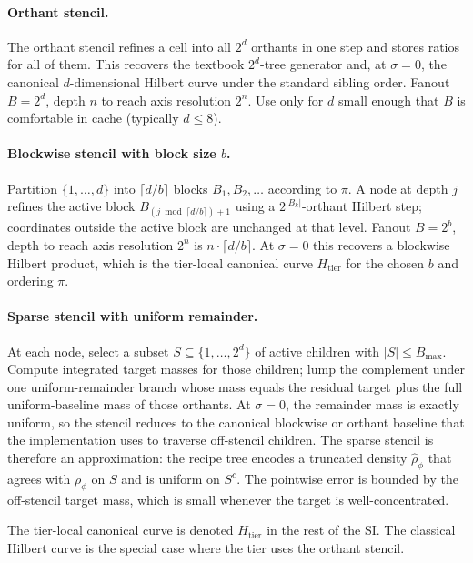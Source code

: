 \documentclass[11pt]{article}
\newcommand{\rhophi}{\rho_{\phi}}
\begin{document}
\paragraph{Orthant stencil.}
The orthant stencil refines a cell into all $2^d$ orthants in one step and stores ratios for all of them. This recovers the textbook $2^d$-tree generator and, at $\sigma=0$, the canonical $d$-dimensional Hilbert curve under the standard sibling order. Fanout $B=2^d$, depth $n$ to reach axis resolution $2^n$. Use only for $d$ small enough that $B$ is comfortable in cache (typically $d\leq 8$).

\paragraph{Blockwise stencil with block size $b$.}
Partition $\{1,\dots,d\}$ into $\lceil d/b\rceil$ blocks $B_1,B_2,\dots$ according to $\pi$. A node at depth $j$ refines the active block $B_{(j\bmod \lceil d/b\rceil)+1}$ using a $2^{|B_k|}$-orthant Hilbert step; coordinates outside the active block are unchanged at that level. Fanout $B=2^b$, depth to reach axis resolution $2^n$ is $n\cdot\lceil d/b\rceil$. At $\sigma=0$ this recovers a blockwise Hilbert product, which is the tier-local canonical curve $H_{\mathrm{tier}}$ for the chosen $b$ and ordering $\pi$.

\paragraph{Sparse stencil with uniform remainder.}
At each node, select a subset $S\subseteq\{1,\dots,2^d\}$ of active children with $|S|\leq B_{\max}$. Compute integrated target masses for those children; lump the complement under one uniform-remainder branch whose mass equals the residual target plus the full uniform-baseline mass of those orthants. At $\sigma=0$, the remainder mass is exactly uniform, so the stencil reduces to the canonical blockwise or orthant baseline that the implementation uses to traverse off-stencil children. The sparse stencil is therefore an approximation: the recipe tree encodes a truncated density $\hat\rhophi$ that agrees with $\rhophi$ on $S$ and is uniform on $S^c$. The pointwise error is bounded by the off-stencil target mass, which is small whenever the target is well-concentrated.

The tier-local canonical curve is denoted $H_{\mathrm{tier}}$ in the rest of the SI. The classical Hilbert curve is the special case where the tier uses the orthant stencil.
\end{document}
